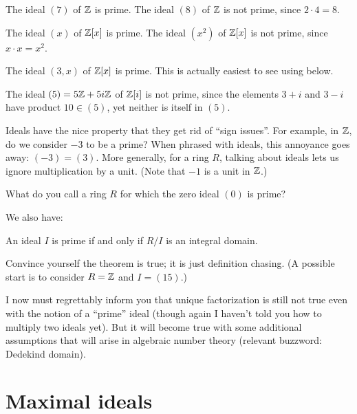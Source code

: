 \begin{example}
	\listhack
	\begin{enumerate}[(a)]
		\ii The ideal $(7)$ of $\mathbb Z$ is prime.
		\ii The ideal $(8)$ of $\mathbb Z$ is not prime,
		since $2 \cdot 4 = 8$.

		\ii The ideal $(x)$ of $\mathbb Z[x]$ is prime.
		\ii The ideal $(x^2)$ of $\mathbb Z[x]$ is not prime,
		since $x \cdot x = x^2$.

		\ii The ideal $(3,x)$ of $\mathbb Z[x]$ is prime.
		This is actually easiest to see
		using  below.

		\ii The ideal $(5) = 5\mathbb Z + 5i\mathbb Z$ of $\mathbb Z[i]$
		is not prime, since the elements
		$3+i$ and $3-i$ have product $10 \in (5)$,
		yet neither is itself in $(5)$.
	\end{enumerate}
\end{example}
\begin{remark}
	\label{rem:unit_sign_issue}
	Ideals have the nice property that they get rid of ``sign issues''.
	For example, in $\mathbb Z$, do we consider $-3$ to be a prime?
	When phrased with ideals, this annoyance goes away: $(-3) = (3)$.
	More generally, for a ring $R$, talking about ideals
	lets us ignore multiplication by a unit.
	(Note that $-1$ is a unit in $\mathbb Z$.)
\end{remark}

\begin{exercise}
	What do you call a ring $R$ for which the zero ideal $(0)$ is prime?
\end{exercise}

We also have:
\begin{theorem}
	\label{thm:prime_ideal_quotient}
	An ideal $I$ is prime if and only if $R/I$ is an integral domain.
\end{theorem}
\begin{exercise}
	[Mandatory]
	Convince yourself the theorem is true;
	it is just definition chasing.
	(A possible start is to consider $R = \mathbb Z$ and $I = (15)$.)
\end{exercise}

I now must regrettably inform you that unique factorization is still
not true even with the notion of a ``prime'' ideal
(though again I haven't told you how to multiply two ideals yet).
But it will become true with some additional assumptions
that will arise in algebraic number theory
(relevant buzzword: Dedekind domain).

\section{Maximal ideals}

